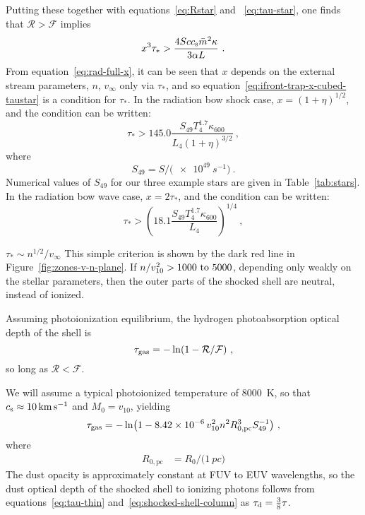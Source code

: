 Putting these together with equations~\eqref{eq:Rstar} and
~\eqref{eq:tau-star}, one finds that \(\mathcal{R} > \mathcal{F}\)
implies
\begin{equation}
  \label{eq:ifront-trap-x-cubed-taustar}
  x^3 \tau_* > \frac{4 S c \sound \bar{m}^2 \kappa}{3 \alpha L} \ .
\end{equation}
From equation~\eqref{eq:rad-full-x}, it can be seen that \(x\) depends
on the external stream parameters, \(n\), \(v_\infty\) only via
\(\tau_*\), and so equation~\eqref{eq:ifront-trap-x-cubed-taustar} is a
condition for \(\tau_*\).  In the radiation bow shock case,
\(x = (1 + \eta)^{1/2}\), and the condition can be written:
\begin{equation}
  \label{eq:ifront-trap-taustar-bow-shock}
  \tau_* > 145.0 \frac{S_{49} T_4^{1.7} \kappa_{600}}{L_4 (1 + \eta)^{3/2}} \ , 
\end{equation}
where
\begin{equation*}
  S_{49} = S / \bigl( \SI{e49}{s^{-1}} \bigr) \ .
\end{equation*}
Numerical values of \(S_{49}\) for our three example stars are given
in Table~\ref{tab:stars}.  In the radiation bow wave case,
\(x = 2\tau_*\), and the condition can be written:
\begin{equation}
  \label{eq:ifront-trap-taustar-bow-shock}
  \tau_* > \left(  18.1 \frac{S_{49} T_4^{1.7} \kappa_{600}}{L_4}\right)^{1/4} \ , 
\end{equation}



\(\tau_* \sim n^{1/2} / v_\infty\) 
This simple
criterion is shown by the dark red line in
Figure~\ref{fig:zones-v-n-plane}.  If 
\(n / v_{10}^2 > \text{\numrange{1000}{5000}}\), depending
only weakly on the stellar parameters, then the outer parts of the
shocked shell are neutral, instead of ionized. 


Assuming photoionization equilibrium, the
hydrogen photoabsorption optical depth of the shell is
\begin{equation}
  \label{eq:ion-tau-gas}
  \tau_{\text{gas}} = - \ln(1 - \mathcal{R} / \mathcal{F}) \ ,
\end{equation}
so long as \(\mathcal{R} < \mathcal{F}\).

We will assume
a typical photoionized temperature of \SI{8000}{K}, so that
\(c_{\text{s}} \approx \SI{10}{km.s^{-1}}\) and \(M_0 = v_{10}\), yielding
\begin{equation}
  \label{eq:ion-tau-gas-expanded}
  \tau\gas = -\ln\bigl(1 -
  \num{8.42e-6}\, v_{10}^2 n^2 R_{0,\text{pc}}^3 S_{49}^{-1}\bigr) \ , 
\end{equation}
where 
\begin{align*}
  R_{0,\text{pc}} &= R_0 / \bigl( \SI{1}{pc} \bigr)
\end{align*}
The dust opacity is approximately constant
at FUV to EUV wavelengths, so the dust optical depth of the shocked
shell to ionizing photons follows from equations~\eqref{eq:tau-thin}
and~\eqref{eq:shocked-shell-column} as \(\tau_{\text{d}} = \tfrac38 \tau\).


